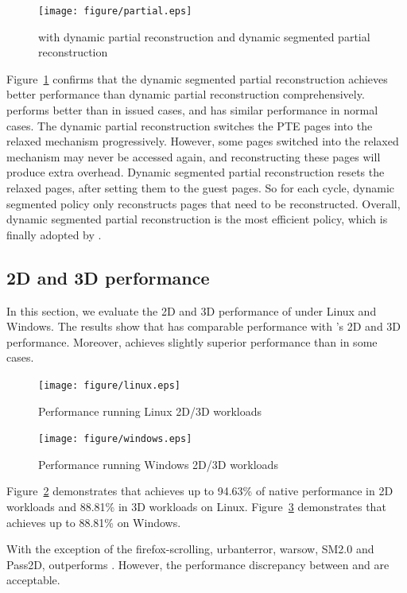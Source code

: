 \begin{figure}[htbp]
 \centering
 \texttt{[image: figure/partial.eps]}\\
 \caption{\name{} with dynamic partial reconstruction and dynamic segmented partial reconstruction}
 \label{fig:partial}
\end{figure}

Figure~\ref{fig:partial} confirms that the dynamic segmented partial reconstruction achieves better performance than dynamic partial reconstruction
comprehensively. \name{} performs better than \gvirt{} in issued cases, and has similar performance in normal cases.
The dynamic partial reconstruction switches the PTE pages into the relaxed mechanism progressively. However, some pages switched into the relaxed mechanism
may never be accessed again, and reconstructing these pages will produce extra overhead. Dynamic segmented partial reconstruction resets the relaxed pages,
after setting them to the guest pages. So for each cycle, dynamic segmented policy only reconstructs pages that need to be reconstructed.
Overall, dynamic segmented partial reconstruction is the most efficient policy, which is finally adopted by \name{}.

\subsection{2D and 3D performance}
In this section, we evaluate the 2D and 3D performance of \name{} under Linux and Windows. The results show
that \name{} has comparable performance with \gvirt{}'s 2D and 3D performance.
Moreover, \name{} achieves slightly superior performance than \gvirt{} in some cases.

\begin{figure}[htbp]
 \centering
 \texttt{[image: figure/linux.eps]}\\
 \caption{Performance running Linux 2D/3D workloads}
 \label{fig:linux}
\end{figure}

\begin{figure}[htbp]
 \centering
 \texttt{[image: figure/windows.eps]}\\
 \caption{Performance running Windows 2D/3D workloads}
 \label{fig:windows}
\end{figure}
\hspace{0pt}

Figure~{\ref{fig:linux}} demonstrates that \name{} achieves up to 94.63\% of native performance in 2D workloads and 88.81\% in 3D workloads on Linux.
Figure~{\ref{fig:windows}} demonstrates that \name{} achieves up to 88.81\% on Windows.

With the exception of the firefox-scrolling, urbanterror, warsow, SM2.0 and Pass2D, \name{} outperforms \gvirt{}. However,
the performance discrepancy between \name{} and \gvirt{} are acceptable.
